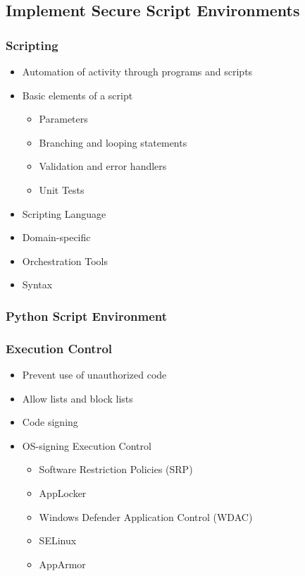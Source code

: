 	\subsection {Implement Secure Script Environments}
		\subsubsection {Scripting}
			\begin{itemize}
				\item Automation of activity through programs and scripts
				\item Basic elements of a script
					\begin{itemize}
						\item Parameters
						\item Branching and looping statements
						\item Validation and error handlers
						\item Unit Tests
					\end{itemize}
				\item Scripting Language
				\item Domain-specific
				\item Orchestration Tools
				\item Syntax
			\end{itemize}
		\subsubsection {Python Script Environment}
		\subsubsection {Execution Control}
			\begin{itemize}
				\item Prevent use of unauthorized code
				\item Allow lists and block lists
				\item Code signing
				\item OS-signing Execution Control
					\begin{itemize}
						\item Software Restriction Policies (SRP)
						\item AppLocker
						\item Windows Defender Application Control (WDAC)
						\item SELinux
						\item AppArmor
					\end{itemize}
			\end{itemize}
